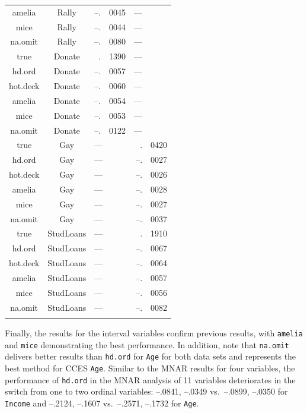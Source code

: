 \documentclass[12pt,econ]{sources/authesis}
\begin{document}
\begin{longtable}{ccr@{}lr@{}l}
 amelia & Rally & --.&0045 & --- \\
 mice & Rally & --.&0044 & --- \\
 na.omit & Rally & --.&0080 & --- \\
 true & Donate & .&1390 & --- \\
 hd.ord & Donate & --.&0057 & --- \\ 
 hot.deck & Donate & --.&0060 & --- \\ 
 amelia & Donate & --.&0054 & --- \\  
 mice & Donate & --.&0053 & --- \\ 
 na.omit & Donate & --.&0122 & --- \\ 
 true & Gay & \multicolumn{2}{l}{---} & .&0420 \\ 
 hd.ord & Gay & \multicolumn{2}{l}{---} & --.&0027 \\
 hot.deck & Gay & \multicolumn{2}{l}{---} & --.&0026 \\ 
 amelia & Gay & \multicolumn{2}{l}{---} & --.&0028 \\ 
 mice & Gay & \multicolumn{2}{l}{---} & --.&0027 \\ 
 na.omit & Gay & \multicolumn{2}{l}{---} & --.&0037 \\
 true & StudLoans & \multicolumn{2}{l}{---} & .&1910 \\
 hd.ord & StudLoans & \multicolumn{2}{l}{---} & --.&0067 \\
 hot.deck & StudLoans & \multicolumn{2}{l}{---} & --.&0064 \\
 amelia & StudLoans & \multicolumn{2}{l}{---} & --.&0057 \\
 mice & StudLoans & \multicolumn{2}{l}{---} & --.&0056 \\ 
 na.omit & StudLoans & \multicolumn{2}{l}{---} & --.&0082 \\
 \hline \\[-1.8ex] 
 \end{longtable}
\dsp

\normalsize

Finally, the results for the interval variables confirm previous results, with \texttt{amelia} and \texttt{mice} demonstrating the best performance. In addition, note that \texttt{na.omit} delivers better results than \texttt{hd.ord} for \texttt{Age} for both data sets and represents the best method for CCES \texttt{Age}. Similar to the MNAR results for four variables, the performance of \texttt{hd.ord} in the MNAR analysis of 11 variables deteriorates in the switch from one to two ordinal variables: --.0841, --.0349 vs.~--.0899, --.0350 for \texttt{Income} and --.2124, --.1607 vs.~--.2571, --.1732 for \texttt{Age}.
\end{document}

